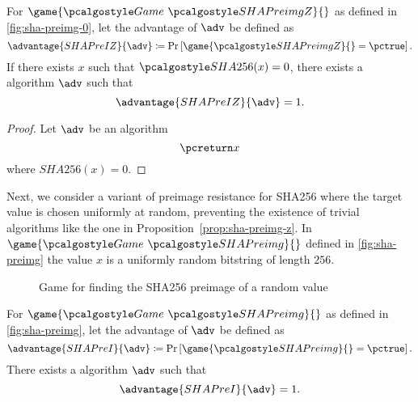 \begin{proposition}\label{prop:sha-preimg-z}
 For $\game{\Game~\algo{SHAPreimgZ}}{}$ as defined in \autoref{fig:sha-preimg-0}, let the advantage of $\adv$ be defined as
 \[
  \advantage{SHAPreIZ}{\adv} \defeq \pr{\game{\algo{SHAPreimgZ}}{} = \pctrue}.
 \]
 If there exists $x$ such that $\algo{SHA256}(x) = 0$, there exists a \ppt algorithm $\adv$ such that
  \[
  \advantage{SHAPreIZ}{\adv} = 1.
  \]
\end{proposition}

\begin{proof}
  Let $\adv$ be an algorithm
  \[
   \pcreturn x
  \]
  where $SHA256(x) = 0$.
\end{proof}

Next, we consider a variant of preimage resistance for SHA256 where the target value is chosen uniformly at random, preventing the existence of trivial algorithms like the one in Proposition~\ref{prop:sha-preimg-z}.
In $\game{\Game~\algo{SHAPreimg}}{}$ defined in \autoref{fig:sha-preimg} the value $x$ is a uniformly random bitstring of length $256$.

\begin{figure}[tbhp]
  \begin{center}
    \begin{tcolorbox}[width=5cm]
      \begin{pchstack}[center]
      \end{pchstack}
    \end{tcolorbox}
  \end{center}
  \caption{Game for finding the SHA256 preimage of a random value \label{fig:sha-preimg}}
\end{figure}

\begin{proposition}
 For $\game{\Game~\algo{SHAPreimg}}{}$ as defined in \autoref{fig:sha-preimg}, let the advantage of $\adv$ be defined as
 \[
  \advantage{SHAPreI}{\adv} \defeq \pr{\game{\algo{SHAPreimg}}{} = \pctrue}.
 \]
 There exists a \ppt algorithm $\adv$ such that
 \[
 \advantage{SHAPreI}{\adv} = 1.
 \]
\end{proposition}

